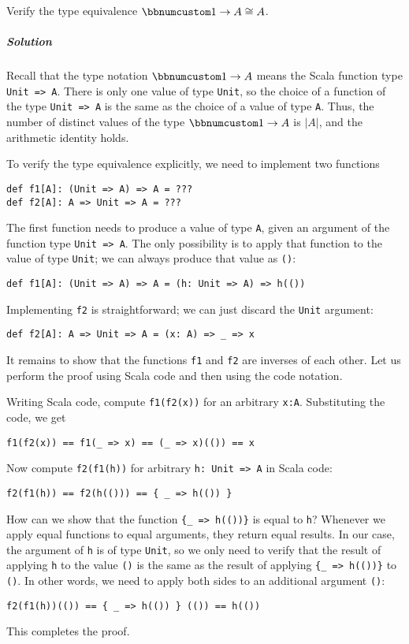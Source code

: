 Verify the type equivalence $\bbnum 1\rightarrow A\cong A$.

\subparagraph{Solution}

Recall that the type notation $\bbnum 1\rightarrow A$ means the Scala
function type \lstinline!Unit => A!. There is only one value of type
\lstinline!Unit!, so the choice of a function of the type \lstinline!Unit => A!
is the same as the choice of a value of type \lstinline!A!. Thus,
the number of distinct values of the type $\bbnum 1\rightarrow A$
is $\left|A\right|$, and the arithmetic identity holds.

To verify the type equivalence explicitly, we need to implement two
functions
\begin{lstlisting}
def f1[A]: (Unit => A) => A = ???
def f2[A]: A => Unit => A = ???
\end{lstlisting}
The first function needs to produce a value of type \lstinline!A!,
given an argument of the function type \lstinline!Unit => A!. The
only possibility is to apply that function to the value of type \lstinline!Unit!;
we can always produce that value as \lstinline!()!:
\begin{lstlisting}
def f1[A]: (Unit => A) => A = (h: Unit => A) => h(())
\end{lstlisting}
Implementing \lstinline!f2! is straightforward; we can just discard
the \lstinline!Unit! argument:
\begin{lstlisting}
def f2[A]: A => Unit => A = (x: A) => _ => x
\end{lstlisting}
It remains to show that the functions \lstinline!f1! and \lstinline!f2!
are inverses of each other. Let us perform the proof using Scala code
and then using the code notation.

Writing Scala code, compute \lstinline!f1(f2(x))! for an arbitrary
\lstinline!x:A!. Substituting the code, we get
\begin{lstlisting}
f1(f2(x)) == f1(_ => x) == (_ => x)(()) == x
\end{lstlisting}
Now compute \lstinline!f2(f1(h))! for arbitrary \lstinline!h: Unit => A!
in Scala code:
\begin{lstlisting}
f2(f1(h)) == f2(h(())) == { _ => h(()) }
\end{lstlisting}
How can we show that the function \lstinline!{_ => h(())}! is equal
to \lstinline!h!? Whenever we apply equal functions to equal arguments,
they return equal results. In our case, the argument of \lstinline!h!
is of type \lstinline!Unit!, so we only need to verify that the result
of applying \lstinline!h! to the value \lstinline!()! is the same
as the result of applying \lstinline!{_ => h(())}! to \lstinline!()!.
In other words, we need to apply both sides to an additional argument
\lstinline!()!:
\begin{lstlisting}
f2(f1(h))(()) == { _ => h(()) } (()) == h(())
\end{lstlisting}
This completes the proof.

